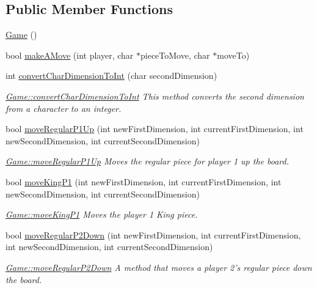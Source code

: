 \subsection*{Public Member Functions}
\begin{DoxyCompactItemize}
\item 
\hyperlink{class_game_ad59df6562a58a614fda24622d3715b65}{Game} ()
\item 
bool \hyperlink{class_game_a85a222741ee55b73e12cca53487f0540}{make\-A\-Move} (int player, char $\ast$piece\-To\-Move, char $\ast$move\-To)
\item 
int \hyperlink{class_game_a708211cd7858e1628cef1b98e2712797}{convert\-Char\-Dimension\-To\-Int} (char second\-Dimension)
\begin{DoxyCompactList}\small\item\em \hyperlink{class_game_a708211cd7858e1628cef1b98e2712797}{Game\-::convert\-Char\-Dimension\-To\-Int} This method converts the second dimension from a character to an integer. \end{DoxyCompactList}\item 
bool \hyperlink{class_game_ab049a593d3f303c4b090f3e25cbf1056}{move\-Regular\-P1\-Up} (int new\-First\-Dimension, int current\-First\-Dimension, int new\-Second\-Dimension, int current\-Second\-Dimension)
\begin{DoxyCompactList}\small\item\em \hyperlink{class_game_ab049a593d3f303c4b090f3e25cbf1056}{Game\-::move\-Regular\-P1\-Up} Moves the regular piece for player 1 up the board. \end{DoxyCompactList}\item 
bool \hyperlink{class_game_aff639012e102ce42f09306bbf580c391}{move\-King\-P1} (int new\-First\-Dimension, int current\-First\-Dimension, int new\-Second\-Dimension, int current\-Second\-Dimension)
\begin{DoxyCompactList}\small\item\em \hyperlink{class_game_aff639012e102ce42f09306bbf580c391}{Game\-::move\-King\-P1} Moves the player 1 King piece. \end{DoxyCompactList}\item 
bool \hyperlink{class_game_aad3a58175a91d8235771707620846429}{move\-Regular\-P2\-Down} (int new\-First\-Dimension, int current\-First\-Dimension, int new\-Second\-Dimension, int current\-Second\-Dimension)
\begin{DoxyCompactList}\small\item\em \hyperlink{class_game_aad3a58175a91d8235771707620846429}{Game\-::move\-Regular\-P2\-Down} A method that moves a player 2's regular piece down the board. \end{DoxyCompactList}\item 

\end{DoxyCompactItemize}
